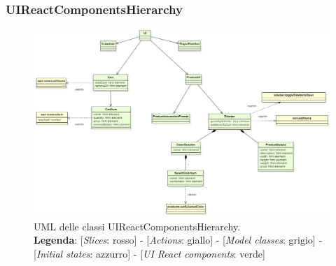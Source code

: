 	\begin{landscape}
		\thispagestyle{empty}
		\subsubsection{UIReactComponentsHierarchy}
		\begin{figure}[H]
			\centering
			\includegraphics[scale=0.7, keepaspectratio]{./res/images/UIReactComponentsHierarchy.PNG}
			\caption[UML delle classi UIReactComponentsHierarchy]{
			UML delle classi UIReactComponentsHierarchy.
			\\
			\textbf{Legenda}: 
			[\textit{Slices}: rosso] -
			[\textit{Actions}: giallo] -
			[\textit{Model classes}: grigio] -
			[\textit{Initial states}: azzurro] -
			[\textit{UI React components}: verde]}
		\end{figure}
	\end{landscape}
	\restoregeometry
	

